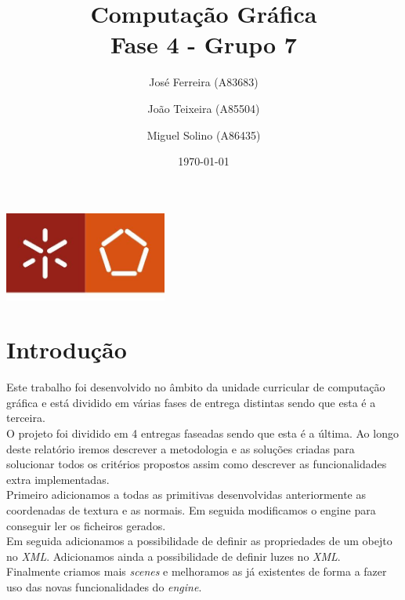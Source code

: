 \documentclass[a4paper]{report}
\begin{document}
\title{Computação Gráfica\\
\large Fase 4 - Grupo 7}
\author{José Ferreira (A83683) \and João Teixeira (A85504) \and Miguel Solino (A86435)}
\date{\today}

\begin{center}
    \begin{minipage}{0.75\linewidth}
        \centering
        \includegraphics[width=0.4\textwidth]{images/eng.jpeg}\par\vspace{1cm}
        \vspace{1.5cm}
        \href{https://www.uminho.pt/PT}
        {\color{black}{\scshape\LARGE Universidade do Minho}} \par
        \vspace{1cm}
        \href{https://www.di.uminho.pt/}
        {\color{black}{\scshape\Large Departamento de Informática}} \par
        \vspace{1.5cm}
        \maketitle
    \end{minipage}
\end{center}

\tableofcontents

\chapter{Introdução}
Este trabalho foi desenvolvido no âmbito da unidade curricular de computação
gráfica e está dividido em várias fases de entrega distintas sendo que esta é a
terceira.\\
O projeto foi dividido em 4 entregas faseadas sendo que esta é a última. Ao
longo deste relatório iremos descrever a metodologia e as soluções criadas para
solucionar todos os critérios propostos assim como descrever as funcionalidades
extra implementadas.\\
Primeiro adicionamos a todas as primitivas desenvolvidas anteriormente as
coordenadas de textura e as normais. Em seguida modificamos o engine para
conseguir ler os ficheiros gerados.\\
Em seguida adicionamos a possibilidade de definir as propriedades de um obejto
no \textit{XML}. Adicionamos ainda a possibilidade de definir luzes no
\textit{XML}.\\
Finalmente criamos mais \textit{scenes} e melhoramos as já existentes de forma a
fazer uso das novas funcionalidades do \textit{engine}.\\
\end{document}
